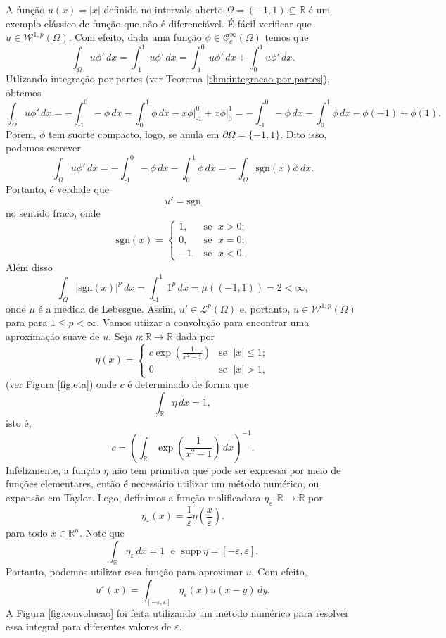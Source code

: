 \documentclass[a4paper, 11pt]{book}
\theoremstyle{definition}
\newcommand{\m}{\text{-}}
\newcommand{\bR}{\mathbb{R}}
\newcommand{\cC}{\mathcal{C}}
\newcommand{\cL}{\mathcal{L}}
\newcommand{\cW}{\mathcal{W}}
\newcommand{\supp}{\mathrm{supp}\,}
\newcommand{\sgn}{\mathrm{sgn}}
\begin{document}
\begin{ex}
    A função $u(x) = |x|$ definida no intervalo aberto $\Omega = (-1,1) \subseteq \bR$ é um exemplo clássico de função que não é diferenciável. É fácil verificar que $u \in \cW^{1,p}(\Omega)$. Com efeito, dada uma função $\phi \in \cC^\infty_c(\Omega)$ temos que
    \[
        \int_\Omega u \phi' \,dx = \int_{\text{-}1}^1 u \phi' \,dx = \int_{\text{-}1}^0 u \phi' \,dx + \int_0^1 u \phi' \,dx.
    \]
    Utlizando integração por partes (ver Teorema \ref{thm:integracao-por-partes}), obtemos
    \[
        \int_\Omega u \phi'\,dx =  - \int_{\m1}^0 -\phi \,dx  - \int_0^1 \phi \,dx -x \phi \bigg|^{0}_{\m1}+ x\phi \bigg|_0^1 = -\int_{\m1}^{0} - \phi \,dx -\int_0^1 \phi \,dx - \phi(-1) + \phi(1).
    \]
    Porem, $\phi$ tem suorte compacto, logo, se anula em $\partial\Omega = \{-1,1\}$. Dito isso, podemos escrever
    \[
        \int_\Omega u \phi'\,dx = - \int_{\text{-}1}^0 -\phi \,dx - \int_0^1 \phi \,dx = -\int_\Omega \sgn(x)\phi \,dx.
    \]
    Portanto, é verdade que
    \[
        u'= \sgn
    \]
    no sentido fraco, onde
    \[
        \sgn(x) = 
        \left\{ 
            \begin{array}{rr}
                1, &\!\text{se }\; x > 0;\\
                0, &\!\text{se }\; x = 0;\\
                -1,&\!\text{se }\; x < 0.
            \end{array}
        \right.
    \]
    Além disso
    \[
        \int_\Omega |\sgn(x)|^p \,dx = \int_{\text{-}1}^1 1^p \,dx =  \mu((-1,1)) = 2 < \infty,
    \]
    onde $\mu$ é a medida de Lebesgue. Assim, $u'\in \cL^p(\Omega)$ e, portanto, $u \in \cW^{1,p}(\Omega)$ para para $1 \leqslant p < \infty$.
    Vamos utiizar a convolução para encontrar uma aproximação suave de $u$. 
    Seja $\eta : \bR \to \bR$ dada por
    \[
        \eta(x) = \left\{ 
            \begin{array}{lr}
                c \exp\left(\frac{1}{x^2 - 1} \right) & \text{se }\; |x| \leqslant 1;\\
                0 & \text{se }\; |x| > 1,
            \end{array}
        \right.
    \]
    (ver Figura \ref{fig:eta})
    onde $c$ é determinado de forma que
    \[
        \int_{\bR} \eta \,dx = 1,
    \]
    isto é,
    \[
        c = \left( \int_\bR \exp \left(\frac{1}{x^2 - 1} \right) \, dx\right)^{-1}.
    \]
    Infelizmente, a função $\eta$ não tem primitiva que pode ser expressa por meio de funções elementares, então é necessário utilizar um método numérico, ou expansão em Taylor.
    Logo, definimos a função molificadora $\eta_\varepsilon : \bR \to \bR$ por
    \[
        \eta_\varepsilon(x) = \frac{1}{\varepsilon} \eta\left( \frac{x}{\varepsilon} \right).
    \]
    para todo $x \in \bR^n$. Note que
    \[
        \int_\bR \eta_\varepsilon \, dx = 1 \;\text{ e }\; \supp \eta = [-\varepsilon,\varepsilon].
    \]
    Portanto, podemos utilizar essa função para aproximar $u$. Com efeito,
    \[
        u^\varepsilon(x) = \int_{[-\varepsilon,\varepsilon]} \eta_\varepsilon(x) u(x-y) \,dy.
    \]
    A Figura \ref{fig:convolucao} foi feita utilizando um método numérico para resolver essa integral para diferentes valores de $\varepsilon$.


\end{ex}
\end{document}
